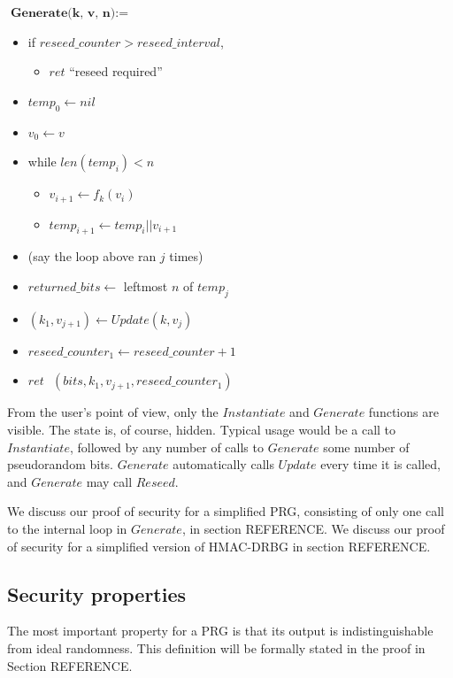 \documentclass[12pt,lot, lof]{puthesis}
\newenvironment{game}
{ \begin{itemize}[noitemsep,nolistsep] 
}
{ \end{itemize}                  }
\newcommand{\s} {\textrm{ }}
\newcommand{\f}{\frac}
\newcommand{\lar}{\leftarrow}
\begin{document}
$\textbf{Generate(k, v, n)} := $
\begin{game}
\item[] if $reseed\_counter > reseed\_interval$, 
  \begin{game}
  \item[] $ret$ ``reseed required''
  \end{game}
\item[] $temp_0 \lar nil$
\item[] $v_0 \lar v$
\item[] while $len(temp_i) < n$
  \begin{game}
    \item[] $v_{i+1} \lar f_k(v_i)$
    \item[] $temp_{i+1} \lar temp_i || v_{i+1}$
  \end{game}
\item[] (say the loop above ran $j$ times)
\item[] $returned\_bits \lar$ leftmost $n$ of $temp_j$
\item[] $(k_1, v_{j+1}) \lar Update(k, v_j)$
\item[] $reseed\_counter_1 \lar reseed\_counter + 1$
\item[] $ret \s (bits, k_1, v_{j+1}, reseed\_counter_1)$\\
\end{game}

From the user's point of view, only the $Instantiate$ and $Generate$ functions are visible. The state is, of course, hidden. Typical usage would be a call to $Instantiate$, followed by any number of calls to $Generate$ some number of pseudorandom bits. $Generate$ automatically calls $Update$ every time it is called, and $Generate$ may call $Reseed$.

We discuss our proof of security for a simplified PRG, consisting of only one call to the internal loop in $Generate$, in section REFERENCE. We discuss our proof of security for a simplified version of HMAC-DRBG in section REFERENCE.

\subsection{Security properties} \label{sec:security_properties}

The most important property for a PRG is that its output is indistinguishable from ideal randomness. This definition will be formally stated in the proof in Section REFERENCE.
\end{document}
